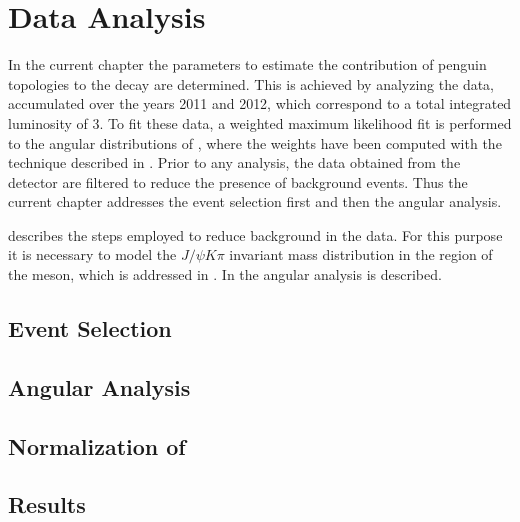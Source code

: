 \chapter{Data Analysis}
\label{Data_Analysis}

In the current chapter the parameters to estimate the contribution of penguin topologies to the \BsJpsiPhi
decay are determined. This is achieved by analyzing the \runone \lhcb data, accumulated over the years 2011 and 2012,
which correspond to a total integrated luminosity of 3\invfb. To fit these data, a weighted maximum likelihood fit
is performed to the angular distributions of \BsJpsiKst, where the weights have been computed with the \sPlot
technique \cite{splot} described in .
Prior to any analysis, the data obtained from the detector are filtered to reduce the presence of
background events. Thus the current chapter addresses the event selection first and then the angular analysis.

 describes the steps employed to reduce background in the data. For this purpose
it is necessary to model the $J/\psi K\pi$ invariant mass distribution in the region of the \Bs meson, which
is addressed in . In  the angular analysis is described.\\

\section{Event Selection}
\label{Event_Selection}


\section{Angular Analysis}
\label{Angular_Analysis}


\section{Normalization of \BsJpsiKpi}
\label{Normalization}


\section{Results}
\label{Results}

